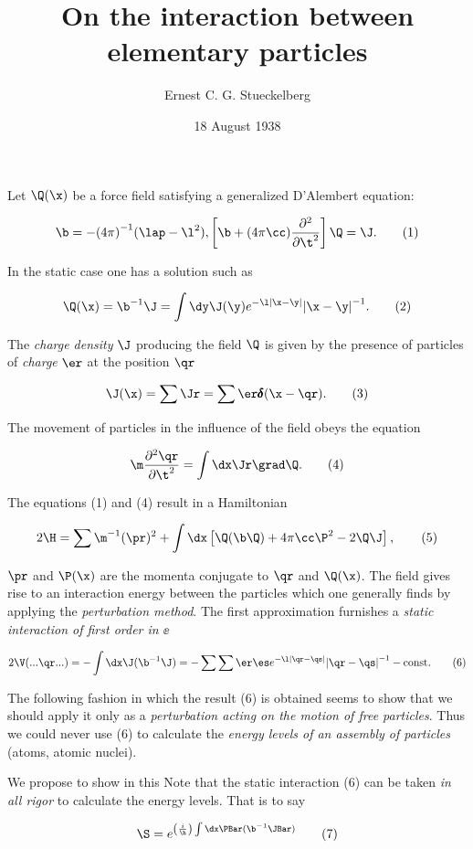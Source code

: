 \documentclass{article}
\newcommand{\const}[1]{#1}
\newcommand{\inv}[1]{{#1}^{-1}}
\newcommand{\func}[1]{\pmb{#1}}
\newcommand{\pddXdYY}[2]{
\frac{\partial^2 {#1}}{\partial {#2}^2}
}
\newcommand{\pddtt}[1]{\pddXdYY{\qr}{\t}}
\renewcommand{\exp}[1]{\const{e}^{#1}}
\newcommand{\dirac}[1]{\func{\delta}{#1}}
\renewcommand{\it}[1]{\textit{#1}}
\newcommand{\nequ}[2]{
\begin{equation*}
#1
\tag{#2}
\end{equation*}
}
\begin{document}
\title{On the interaction between elementary particles}
\author{Ernest C. G. Stueckelberg}
\date{18 August 1938}
\maketitle

Let $\Q(\x)$ be a force field satisfying a generalized D'Alembert equation:

\nequ{
\b = -\inv{(4\pi)}(\lap - \l^2), \left[ \b + (4\pi\cc)\frac{\partial^2}{\partial \t^2} \right]\Q = \J.
}{1}

In the static case one has a solution such as

\nequ{
\Q(\x) = \inv{\b}\J = \int\dy\J(\y)\exp{-\l |\x - \y|}\inv{|\x - \y|}.
}{2}

The \it{charge density} $\J$ producing the field $\Q$ is given by the presence of particles of \it{charge} $\er$ at the position $\qr$

\nequ{
\J(\x) = \sum\Jr = \sum\er\dirac(\x - \qr).
}{3}

The movement of particles in the influence of the field obeys the equation

\nequ{
\m\pddtt{\qr} = \int\dx\Jr\grad\Q.
}{4}

The equations (1) and (4) result in a Hamiltonian

\nequ{
2\H = \sum\inv{\m}(\pr)^2 + \int\dx \left[ \Q(\b\Q) + 4\pi\cc\P^2 - 2\Q\J \right],
}{5}

$\pr$ and $\P(\x)$ are the momenta conjugate to $\qr$ and $\Q(\x)$. The field gives rise to an interaction energy between the particles which one generally finds by applying the \it{perturbation method}. The first approximation furnishes a \it{static interaction of first order in $\ee$}

\nequ{
2\V(...\qr...) = -\int\dx\J(\inv{\b}\J) = -\sum\sum\er\es\exp{-\l|\qr-\qs|}\inv{|\qr-\qs|} - \text{const}.
}{6}

The following fashion in which the result (6) is obtained seems to show that we should apply it only as a \it{perturbation acting on the motion of free particles}. Thus we could never use (6) to calculate the \it{energy levels of an assembly of particles} (atoms, atomic nuclei).

We propose to show in this Note that the static interaction (6) can be taken \it{in all rigor} to calculate the energy levels. That is to say

\nequ{
\S = \exp{\left( \frac{i}{\h} \right)\int\dx\PBar(\inv{\b}\JBar)}
}{7}
\end{document}
